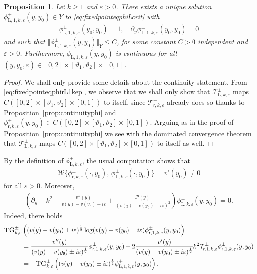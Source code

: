 \documentclass[11pt,reqno]{amsproc}
\newtheorem{proposition}{Proposition}[section]
\theoremstyle{definition}
\numberwithin{equation}{section}
\newcommand{\rL}{{\mathrm{L}}}
\newcommand{\sr}{{\mathsf{r}}}
\newcommand{\cT}{{\mathcal T}}
\newcommand{\W}{{\mathcal{W}}}
\newcommand{\ep}{\varepsilon}
\renewcommand{\P}{{\mathcal{P}}}
\begin{document}
\begin{proposition}\label{prop:existencephiLcrit}
Let $k\geq 1$ and $\ep>0$. There exists a unique solution $\phi_{\rL,1,k,\ep}^\pm(y,y_0)\in Y$ to \eqref{eq:fixedpointeqphiLcrit} with
\begin{align*}
\phi_{\rL,1,k,\ep}^\pm(y_0,y_0) = 1, \quad 
\partial_y \phi_{\rL,1,k,\ep}^\pm(y_0,y_0) = 0
\end{align*}
and such that $\Vert \phi_{\rL,1,k,\ep}^\pm(y,y_0) \Vert_Y \leq C$, for some constant $C>0$ independent and $\ep>0$. Furthermore, $\phi_{\rL,1,k,\ep}(y,y_0)$ is continuous for all $(y,y_0,\ep)\in [0,2]\times[\vartheta_1,\vartheta_2]\times[0,1]$.
\end{proposition}


\begin{proof}
    We shall only provide some details about the continuity statement. From \eqref{eq:fixedpointeqphirL1kep}, we observe that we shall only show that $\cT_{\rL,k,\ep}^\pm$ maps $C([0,2]\times[\vartheta_1,\vartheta_2]\times[0,1])$ to itself, since $\cT_{\sr,k,\ep}^\pm$ already does so thanks to Proposition~\ref{prop:continuityphi} and $\phi_{\sr,k,\ep}^\pm(y,y_0)\in C([0,2]\times[\vartheta_1,\vartheta_2]\times[0,1])$. Arguing as in the proof of Proposition~\ref{prop:continuityphi} we see with the dominated convergence theorem that $\cT_{\rL,k,\ep}^\pm$ maps $C([0,2]\times[\vartheta_1,\vartheta_2]\times[0,1])$ to itself as well.
\end{proof}


By the definition of $\phi_{\rL,k,\ep}^\pm$, the usual computation shows that
\begin{align*}
\W \lbrace \phi_{\sr,k,\ep}^\pm(\cdot, y_0), \, \phi_{\rL,k,\ep}^\pm(\cdot,y_0) \rbrace = v'(y_0)\neq 0
\end{align*}
for all $\ep>0$. Moreover, 
\begin{align*}
\left( \partial_y - k^2 -\frac{v''(y)}{v(y) - v(y_0) \pm i\ep} + \frac{\P(y)}{(v(y) - v(y_0) \pm i\ep)^2} \right) \phi_{\rL,k,\ep}^\pm(y,y_0) = 0.
\end{align*}
Indeed, there holds
\begin{align*}
\textsc{TG}_{k,\ep}^\pm &\left( (v(y) - v(y_0) \pm i\ep)^\frac12 \log(v(y) - v(y_0) \pm i\ep) \phi_{\sr,1,k,\ep}^\pm(y,y_0) \right) \\
&= \frac{v''(y)}{(v(y) - v(y_0) \pm i\ep)^\frac12}\phi_{\sr,1,k,\ep}^\pm(y,y_0) + 2\frac{v'(y)}{(v(y) - v(y_0) \pm i\ep)^\frac12} k^2\cT_{\sr,1,k,\ep}^\pm \phi_{\sr,1,k,\ep}^\pm(y,y_0) \\
&= - \textsc{TG}_{k,\ep}^\pm \left( (v(y) - v(y_0) \pm i\ep)^\frac12  \phi_{\rL,1,k,\ep}^\pm(y,y_0) \right).
\end{align*}
\end{document}
